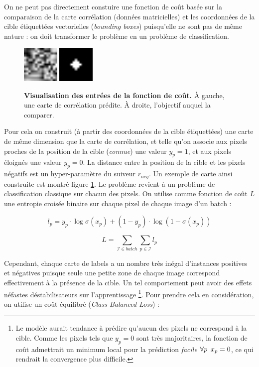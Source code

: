 \documentclass[10pt,twocolumn,letterpaper,french]{article}
\begin{document}
On ne peut pas directement constuire une fonction de coût basée sur la comparaison de la carte corrélation (données matricielles) et les coordonnées de la cible étiquettées vectorielles (\textit{bounding boxes}) puisqu'elle ne sont pas de même nature : on doit transformer le problème en un problème de classification.

\begin{figure}[!h]
\centering
\includegraphics[width=50pt]{images/loss/predict.png}
\hspace{0.7cm}
\includegraphics[width=50pt]{images/loss/target.png}
\caption{\textbf{Visualisation des entrées de la fonction de coût.} À gauche, une carte de corrélation prédite. À droite, l'objectif auquel la comparer.}
\label{loss_corr}
\end{figure}

Pour cela on construit (à partir des coordonnées de la cible étiquettées) une carte de même dimension que la carte de corrélation, et telle qu'on associe aux pixels proches de la position de la cible (\textit{connue}) une valeur $y_{p}=1$, et aux pixels éloignés une valeur $y_{p}=0$. La distance entre la position de la cible et les pixels négatifs est un hyper-paramètre du suiveur $r_{neg}$. Un exemple de carte ainsi construite est montré figure \ref{loss_corr}. Le problème revient à un problème de classification classique sur chacun des pixels. On utilise comme fonction de coût $L$ une entropie croisée binaire sur chaque pixel de chaque image d'un batch :

$$l_p = y_{p} \cdot \log \sigma\left(x_{p}\right)+\left(1-y_{p}\right) \cdot \log \left(1-\sigma\left(x_{p}\right)\right)$$

$$L = \sum_{\mathcal{I} \in batch} \sum_{p \in \mathcal{I}} l_p$$

Cependant, chaque carte de labels a un nombre très inégal d'instances positives et négatives puisque seule une petite zone de chaque image correspond effectivement à la présence de la cible. Un tel comportement peut avoir des effets néfastes déstabilisateurs sur l'apprentissage \footnote{Le modèle aurait tendance à prédire qu'aucun des pixels ne correspond à la cible. Comme les pixels tels que $y_{p}=0$ sont très majoritaires, la fonction de coût admettrait un minimum local pour la prédiction \textit{facile} $\forall p \hspace{0.5em} x_{p}=0$, ce qui rendrait la convergence plus difficile.}. Pour prendre cela en considération, on utilise un coût équilibré (\textit{Class-Balanced Loss}) :
\end{document}
